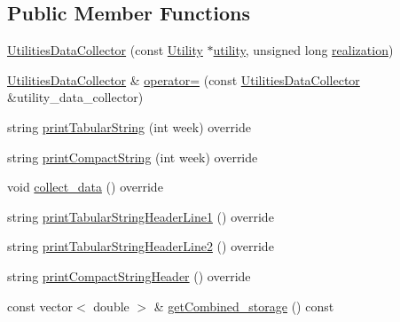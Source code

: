 \subsection*{Public Member Functions}
\begin{DoxyCompactItemize}
\item 
\mbox{\hyperlink{classUtilitiesDataCollector_a7aee55a1cbd0fcdca59339a9e78ed08b_a7aee55a1cbd0fcdca59339a9e78ed08b}{Utilities\+Data\+Collector}} (const \mbox{\hyperlink{classUtility}{Utility}} $\ast$\mbox{\hyperlink{classUtilitiesDataCollector_a215beae386004a66b72e40c3f07a7455_a215beae386004a66b72e40c3f07a7455}{utility}}, unsigned long \mbox{\hyperlink{classDataCollector_a9ef2887466fe3123aa19ef956a219b96_a9ef2887466fe3123aa19ef956a219b96}{realization}})
\item 
\mbox{\hyperlink{classUtilitiesDataCollector}{Utilities\+Data\+Collector}} \& \mbox{\hyperlink{classUtilitiesDataCollector_a805182c7f423290135a5c92844cdbb4a_a805182c7f423290135a5c92844cdbb4a}{operator=}} (const \mbox{\hyperlink{classUtilitiesDataCollector}{Utilities\+Data\+Collector}} \&utility\+\_\+data\+\_\+collector)
\item 
string \mbox{\hyperlink{classUtilitiesDataCollector_a39e7d28a70a0f71b3f1cc28b19c7e2d9_a39e7d28a70a0f71b3f1cc28b19c7e2d9}{print\+Tabular\+String}} (int week) override
\item 
string \mbox{\hyperlink{classUtilitiesDataCollector_a57b5f9cd8ddf54154476749ab0977355_a57b5f9cd8ddf54154476749ab0977355}{print\+Compact\+String}} (int week) override
\item 
void \mbox{\hyperlink{classUtilitiesDataCollector_ab72c4432d6816beb1f4f4b354fb3023d_ab72c4432d6816beb1f4f4b354fb3023d}{collect\+\_\+data}} () override
\item 
string \mbox{\hyperlink{classUtilitiesDataCollector_a796aa9d7637d8ed04dbd949ca2a34088_a796aa9d7637d8ed04dbd949ca2a34088}{print\+Tabular\+String\+Header\+Line1}} () override
\item 
string \mbox{\hyperlink{classUtilitiesDataCollector_ae502a096e8f4fdfdfd481ab2093f9771_ae502a096e8f4fdfdfd481ab2093f9771}{print\+Tabular\+String\+Header\+Line2}} () override
\item 
string \mbox{\hyperlink{classUtilitiesDataCollector_ab3409c407783fd4451f310d2fc177b22_ab3409c407783fd4451f310d2fc177b22}{print\+Compact\+String\+Header}} () override
\item 
const vector$<$ double $>$ \& \mbox{\hyperlink{classUtilitiesDataCollector_af8dbc15ad82c1209b9fc75b25321f408_af8dbc15ad82c1209b9fc75b25321f408}{get\+Combined\+\_\+storage}} () const

\end{DoxyCompactItemize}

